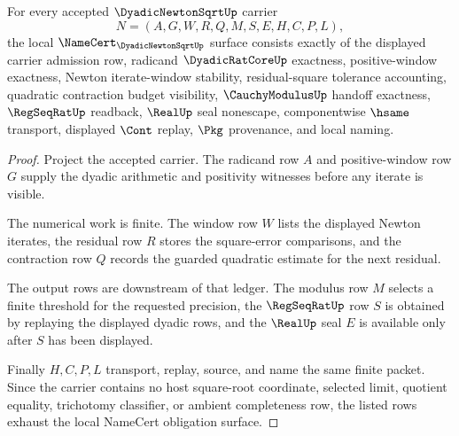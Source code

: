 \begin{theorem}
\label{thm:dyadic-newton-sqrt-namecert-obligations}
For every accepted $\DyadicNewtonSqrtUp$ carrier
$$
N=(A,G,W,R,Q,M,S,E,H,C,P,L),
$$
the local $\NameCert_{\DyadicNewtonSqrtUp}$ surface consists exactly of the displayed carrier admission row, radicand $\DyadicRatCoreUp$ exactness, positive-window exactness, Newton iterate-window stability, residual-square tolerance accounting, quadratic contraction budget visibility, $\CauchyModulusUp$ handoff exactness, $\RegSeqRatUp$ readback, $\RealUp$ seal nonescape, componentwise $\hsame$ transport, displayed $\Cont$ replay, $\Pkg$ provenance, and local naming.
\end{theorem}
\begin{proof}
Project the accepted carrier. The radicand row $A$ and positive-window row $G$ supply the dyadic arithmetic and positivity witnesses before any iterate is visible.

The numerical work is finite. The window row $W$ lists the displayed Newton iterates, the residual row $R$ stores the square-error comparisons, and the contraction row $Q$ records the guarded quadratic estimate for the next residual.

The output rows are downstream of that ledger. The modulus row $M$ selects a finite threshold for the requested precision, the $\RegSeqRatUp$ row $S$ is obtained by replaying the displayed dyadic rows, and the $\RealUp$ seal $E$ is available only after $S$ has been displayed.

Finally $H,C,P,L$ transport, replay, source, and name the same finite packet. Since the carrier contains no host square-root coordinate, selected limit, quotient equality, trichotomy classifier, or ambient completeness row, the listed rows exhaust the local NameCert obligation surface.
\end{proof}

